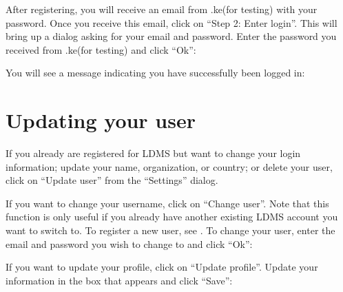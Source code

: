 \documentclass[letterpaper,10pt,english]{sphinxmanual}
\begin{document}

\sphinxAtStartPar
After registering, you will receive an email from .ke(for testing) with your
password. Once you receive this email, click on “Step 2: Enter login”. This
will bring up a dialog asking for your email and password. Enter the password
you received from .ke(for testing) and click “Ok”:


\sphinxAtStartPar
You will see a message indicating you have successfully been logged in:



\section{Updating your user}
\label{\detokenize{Qgis_Plugin/Registration:updating-your-user}}
\sphinxAtStartPar
If you already are registered for LDMS but want to change your login
information; update your name, organization, or country; or delete your user,
click on “Update user” from the “Settings” dialog.


\sphinxAtStartPar
If you want to change your username, click on “Change user”. Note that this
function is only useful if you already have another existing LDMS
account you want to switch to. To register a new user, see {\hyperref[\detokenize{Qgis_Plugin/Registration:registration}]{}}.
To change your user, enter the email and password you wish to change to and
click “Ok”:


\sphinxAtStartPar
If you want to update your profile, click on “Update profile”. Update your
information in the box that appears and click “Save”:
\end{document}
